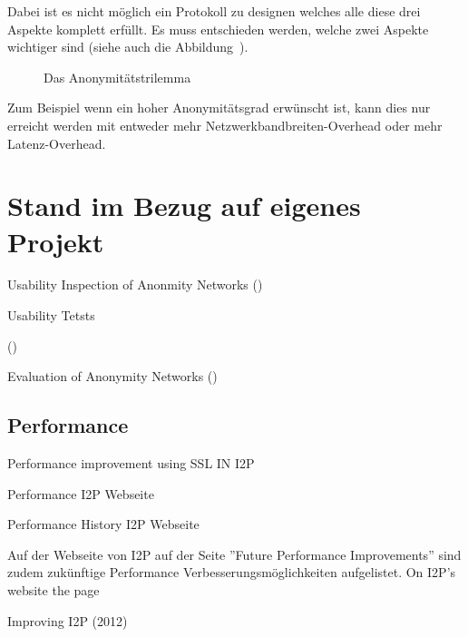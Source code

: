 Dabei ist es nicht möglich ein Protokoll zu designen welches alle diese drei Aspekte komplett erfüllt.
Es muss entschieden werden, welche zwei Aspekte wichtiger sind (siehe auch die Abbildung~). \parencite{das_anonymity_2018}

\begin{figure*}[h]
    \caption{Das Anonymitätstrilemma}\label{fig:anonimitytrilemma}
\end{figure*}

Zum Beispiel wenn ein hoher Anonymitätsgrad erwünscht ist, kann dies nur erreicht werden mit entweder mehr Netzwerkbandbreiten-Overhead oder mehr Latenz-Overhead.


\section{Stand im Bezug auf eigenes Projekt}

Usability Inspection of Anonmity Networks
(\cite{abou-tair_usability_2009})

Usability Tetsts

(\cite{schomburg_anonymity_2009})

Evaluation of Anonymity Networks
(\cite{timpanaro_evaluation_2015})

\subsection{Performance}


Performance improvement using SSL IN I2P
\cite{vashi_performance_2015}

Performance I2P Webseite
\cite{noauthor_performance_nodate}

Performance History I2P Webseite
\cite{noauthor_performance_nodate-1}

Auf der Webseite von I2P auf der Seite ''Future Performance Improvements'' sind zudem zukünftige Performance Verbesserungsmöglichkeiten aufgelistet.
\cite{noauthor_future_nodate}
On I2P's website the page 

Improving I2P (2012)
\cite{timpanaro_improving_2012}


